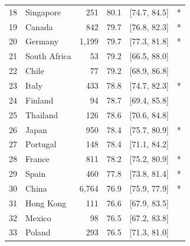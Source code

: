 \begin{table}[h]
\begin{tabular}{@{}rlrrrr@{}}
18 & Singapore           &   251 & 80.1 & [74.7, 84.5] & * \\
19 & Canada              &   842 & 79.7 & [76.8, 82.3] & * \\
20 & Germany             & 1,199 & 79.7 & [77.3, 81.8] & * \\
21 & South Africa        &    53 & 79.2 & [66.5, 88.0] &   \\
22 & Chile               &    77 & 79.2 & [68.9, 86.8] &   \\
23 & Italy               &   433 & 78.8 & [74.7, 82.3] & * \\
24 & Finland             &    94 & 78.7 & [69.4, 85.8] &   \\
25 & Thailand            &   126 & 78.6 & [70.6, 84.8] &   \\
26 & Japan               &   950 & 78.4 & [75.7, 80.9] & * \\
27 & Portugal            &   148 & 78.4 & [71.1, 84.2] &   \\
28 & France              &   811 & 78.2 & [75.2, 80.9] & * \\
29 & Spain               &   460 & 77.8 & [73.8, 81.4] & * \\
30 & China               & 6,764 & 76.9 & [75.9, 77.9] & * \\
31 & Hong Kong           &   111 & 76.6 & [67.9, 83.5] &   \\
32 & Mexico              &    98 & 76.5 & [67.2, 83.8] &   \\
33 & Poland              &   293 & 76.5 & [71.3, 81.0] &   \\
\bottomrule
\end{tabular}
\end{table}

